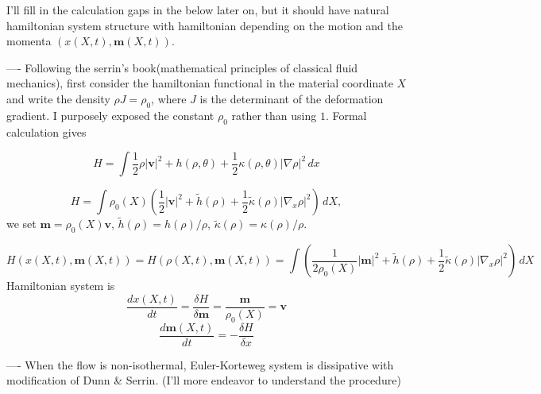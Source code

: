 \documentclass[a4paper,12pt]{article}
\begin{document}
I'll fill in the calculation gaps in the below later on, but it should have natural hamiltonian system structure with hamiltonian depending on the motion and the momenta $(x(X,t), \mathbf{m}(X,t))$.

----
Following the serrin's book(mathematical principles of classical fluid mechanics), first consider the hamiltonian functional in the material coordinate $X$ and write the density {{{$\rho J = \rho_0$}}}, where $J$ is the determinant of the deformation gradient. I purposely exposed the constant {{{$\rho_0$}}} rather than using $1$. Formal calculation gives

{{{ $$ H = \int \frac{1}{2} \rho|\mathbf{v}|^2 + h(\rho,\theta) + \frac{1}{2}\kappa(\rho,\theta) |\nabla\rho|^2 \, dx $$ }}}

{{{ $$ H = \int \rho_0(X) \left(\frac{1}{2} |\mathbf{v}|^2 + \tilde{h}(\rho) + \frac{1}{2}\tilde{\kappa}(\rho) |\nabla_{x}\rho|^2\right) \, dX, $$ }}} we set {{{$\mathbf{m} = \rho_0(X)\mathbf{v}$, $\tilde{h}(\rho) = h(\rho)/\rho$, $\tilde{\kappa}(\rho)= \kappa(\rho)/\rho$}}}.

{{{ $$ H(x(X,t),\mathbf{m}(X,t)) = H(\rho(X,t),\mathbf{m}(X,t)) = \int \left(\frac{1}{2\rho_0(X)} |\mathbf{m}|^2 + \tilde{h}(\rho) + \frac{1}{2}\tilde{\kappa}(\rho) |\nabla_{x}\rho|^2\right) \, dX $$ }}} Hamiltonian system is {{{ $$\frac{dx(X,t)}{dt} = \frac{\delta H}{\delta \mathbf{m}} = \frac{\mathbf{m}}{\rho_0(X)} =  \mathbf{v}  $$}}} {{{ $$\frac{d\mathbf{m}(X,t)}{dt} = -\frac{\delta H}{\delta x} $$}}}

----
When the flow is non-isothermal, Euler-Korteweg system is dissipative with modification of Dunn \& Serrin. (I'll more endeavor to understand the procedure)
\end{document}
